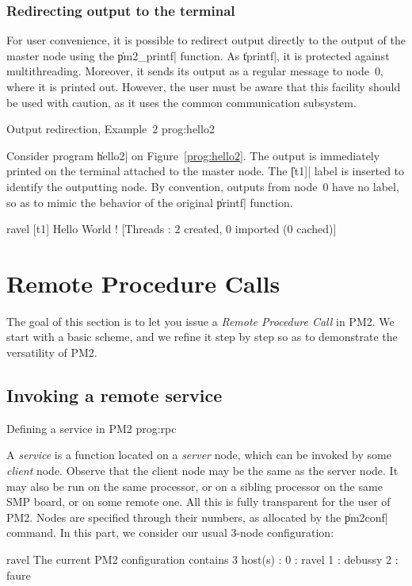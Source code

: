 \subsubsection{Redirecting output to the terminal}

For user convenience, it is possible to redirect output directly
to the output of the master node using the \|pm2_printf| function. As
\|tprintf|, it is protected against multithreading. Moreover, it sends
its output as a regular message to node~0, where it is printed out.
However, the user must be aware that this facility should be used with
caution, as it uses the common communication subsystem. 

 {Output redirection,
  Example~2} {prog:hello2}

Consider program \|hello2| on Figure~\ref{prog:hello2}. The output is
immediately printed on the terminal attached to the master node. The
\|[t1]| label is inserted to identify the outputting node. By
convention, outputs from node~0 have no label, so as to mimic the
behavior of the original \|printf| function.
\begin{shell}
ravel%
[t1] Hello World !
[Threads : 2 created, 0 imported (0 cached)]
\end{shell}


\section{Remote Procedure Calls}

The goal of this section is to let you issue a \emph{Remote Procedure
  Call} in PM2. We start with a basic scheme, and we refine it step by
  step so as to demonstrate the versatility of PM2.

\subsection{Invoking a remote service}

 {Defining a service in PM2} {prog:rpc}

A \emph{service} is a function located on a \emph{server} node, which
can be invoked by some \emph{client} node. Observe that the client
node may be the same as the server node. It may also be run on the
same processor, or on a sibling processor on the same SMP board, or on
some remote one. All this is fully transparent for the user of PM2.
Nodes are specified through their numbers, as allocated by the
\|pm2conf| command. In this part, we consider our usual 3-node
configuration:
\begin{shell}
ravel%
The current PM2 configuration contains 3 host(s) :
0 : ravel
1 : debussy
2 : faure
\end{shell}

